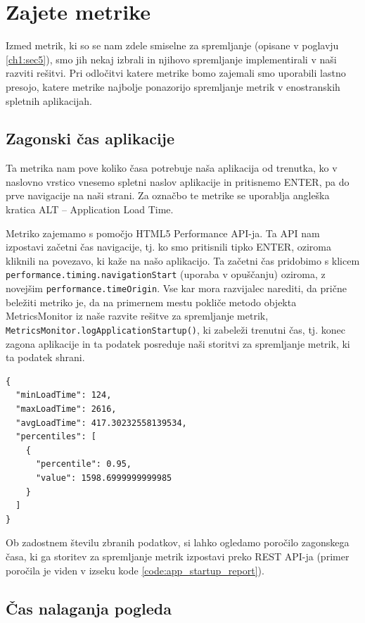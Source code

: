 \documentclass[a4paper, 12pt]{book}
\begin{document}
\section{Zajete metrike}
\label{ch2:sec0}

Izmed metrik, ki so se nam zdele smiselne za spremljanje (opisane v poglavju \ref{ch1:sec5}), smo jih nekaj izbrali in njihovo spremljanje implementirali v naši razviti rešitvi. Pri odločitvi katere metrike bomo zajemali smo uporabili lastno presojo, katere metrike najbolje ponazorijo spremljanje metrik v enostranskih spletnih aplikacijah.

\subsection{Zagonski čas aplikacije}
\label{ch2:sec1}
Ta metrika nam pove koliko časa potrebuje naša aplikacija od trenutka, ko v naslovno vrstico vnesemo spletni naslov aplikacije in pritisnemo ENTER, pa do prve navigacije na naši strani. Za označbo te metrike se uporablja angleška kratica ALT – Application Load Time.

Metriko zajemamo s pomočjo HTML5 Performance API-ja. Ta API nam izpostavi začetni čas navigacije, tj. ko smo pritisnili tipko ENTER, oziroma kliknili na povezavo, ki kaže na našo aplikacijo. Ta začetni čas pridobimo s klicem \verb|performance.timing.navigationStart| (uporaba v opuščanju) oziroma, z novejšim \verb|performance.timeOrigin|. Vse kar mora razvijalec narediti, da prične beležiti metriko je, da na primernem mestu pokliče metodo objekta MetricsMonitor iz naše razvite rešitve za spremljanje metrik, \verb|MetricsMonitor.logApplicationStartup()|, ki zabeleži trenutni čas, tj. konec zagona aplikacije in ta podatek posreduje naši storitvi za spremljanje metrik, ki ta podatek shrani.

\begin{lstlisting}[label=code:app_startup_report, caption=Poročilo zagonskega časa aplikacije]
{
  "minLoadTime": 124,
  "maxLoadTime": 2616,
  "avgLoadTime": 417.30232558139534,
  "percentiles": [
    {
      "percentile": 0.95,
      "value": 1598.6999999999985
    }
  ]
}
\end{lstlisting}

Ob zadostnem številu zbranih podatkov, si lahko ogledamo poročilo zagonskega časa, ki ga storitev za spremljanje metrik izpostavi preko REST API-ja (primer poročila je viden v izseku kode \ref{code:app_startup_report}).


\subsection{Čas nalaganja pogleda}
\label{ch2:sec2}
\end{document}
